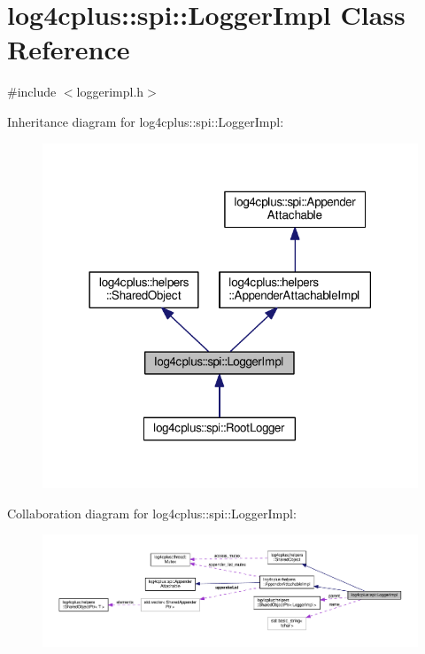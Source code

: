 \hypertarget{classlog4cplus_1_1spi_1_1LoggerImpl}{\section{log4cplus\-:\-:spi\-:\-:Logger\-Impl Class Reference}
\label{classlog4cplus_1_1spi_1_1LoggerImpl}
}


{\ttfamily \#include $<$loggerimpl.\-h$>$}



Inheritance diagram for log4cplus\-:\-:spi\-:\-:Logger\-Impl\-:
\nopagebreak
\begin{figure}[H]
\begin{center}
\leavevmode
\includegraphics[width=318pt]{classlog4cplus_1_1spi_1_1LoggerImpl__inherit__graph}
\end{center}
\end{figure}


Collaboration diagram for log4cplus\-:\-:spi\-:\-:Logger\-Impl\-:
\nopagebreak
\begin{figure}[H]
\begin{center}
\leavevmode
\includegraphics[width=350pt]{classlog4cplus_1_1spi_1_1LoggerImpl__coll__graph}
\end{center}
\end{figure}
